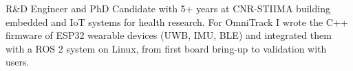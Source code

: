 {R\&D Engineer and PhD Candidate with 5+ years at CNR-STIIMA building embedded and IoT systems for health research. For OmniTrack I wrote the C++ firmware of ESP32 wearable devices (UWB, IMU, BLE) and integrated them with a ROS 2 system on Linux, from first board bring-up to validation with users.}

